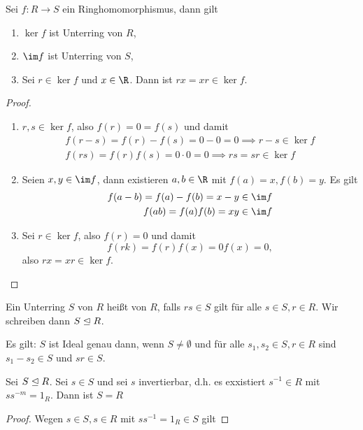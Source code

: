 \begin{lem} %
	Sei $f: R \to S$ ein Ringhomomorphismus, dann gilt
	\begin{enumerate}[1.]
		\item
			$\ker f$ ist Unterring von $R$,
		\item
			$\im f$ ist Unterring von $S$,
		\item
			Sei $r \in \ker f$ und $x \in \R$.
			Dann ist $rx = xr \in \ker f$.
	\end{enumerate}
	\begin{proof}
		\begin{enumerate}[1.]
			\item
				$r, s \in \ker f$, also $f(r) = 0 = f(s)$ und damit
				\begin{align*}
					f(r - s) = f(r) - f(s) = 0 - 0 = 0 \implies r- s \in \ker f \\
					f(rs) = f(r) f(s) = 0 \cdot 0 = 0 \implies rs = sr \in \ker f
				\end{align*}
			\item
				Seien $x, y \in \im f$, dann existieren $a, b \in \R$ mit $f(a) = x, f(b) = y$.
				Es gilt
				\begin{align*}
					f(a - b) = f(a) - f(b) = x - y \in \im f \\
					f(a b) = f(a) f(b) = x y \in \im f
				\end{align*}
			\item
				Sei $r \in \ker f$, also $f(r) = 0$ und damit
				\[
					f(r k) = f(r)f(x) = 0 f(x) = 0,
				\]
				also $rx = xr \in \ker f$.
		\end{enumerate}
	\end{proof}
\end{lem}

\begin{df}
	Ein Unterring $S$ von $R$ heißt  von $R$, falls $rs \in S$ gilt für alle $s \in S, r \in R$.
	Wir schreiben dann $S \trianglelefteq R$.
	\begin{note}
		Es gilt: $S$ ist Ideal genau dann, wenn $S \neq \emptyset$ und für alle $s_1, s_2 \in S, r \in R$ sind $s_1 - s_2 \in S$ und $sr \in S$.
	\end{note}
\end{df}

\begin{ex}
	Sei $S \trianglelefteq R$.
	Sei $s \in S$ und sei $s$ invertierbar, d.h. es exxistiert $s^{-1} \in R$ mit $ss^{-m} = 1_R$.
	Dann ist $S = R$
	\begin{proof}
		Wegen $s \in S, s \in R$ mit $ss^{-1} = 1_R \in S$ gilt %
	\end{proof}
\end{ex}





